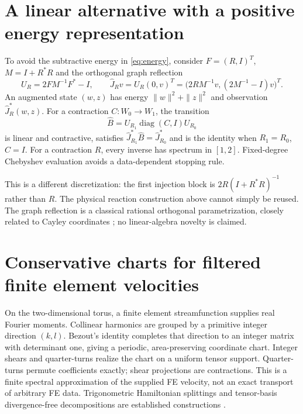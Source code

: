 \documentclass[10pt,a4paper]{article}
\begin{document}
\section{A linear alternative with a positive energy representation}
To avoid the subtractive energy in \eqref{eq:energy}, consider
$F=(R,I)^T$, $M=I+R^*R$ and the orthogonal graph reflection
\[
 U_R=2FM^{-1}F^*-I,\qquad
 \widehat J_Rv=U_R(0,v)^T
  =\bigl(2RM^{-1}v,(2M^{-1}-I)v\bigr)^T.
\]
An augmented state $(w,z)$ has energy $\|w\|^2+\|z\|^2$ and
observation $\widehat J_R^*(w,z)$. For a contraction
$C:W_0\to W_1$, the transition
\[
 \widehat B=U_{R_1}\operatorname{diag}(C,I)U_{R_0}
\]
is linear and contractive, satisfies
$\widehat J_{R_1}^*\widehat B=\widehat J_{R_0}^*$ and is the identity
when $R_1=R_0$, $C=I$. For a contraction $R$, every inverse has
spectrum in $[1,2]$. Fixed-degree Chebyshev evaluation avoids a
data-dependent stopping rule.

This is a different discretization: the first injection block is
$2R(I+R^*R)^{-1}$ rather than $R$. The physical reaction construction
above cannot simply be reused. The graph reflection is a classical
rational orthogonal parametrization, closely related to Cayley
coordinates \cite{cayley}; no linear-algebra novelty is claimed.


\section{Conservative charts for filtered finite element velocities}
On the two-dimensional torus, a finite element streamfunction supplies
real Fourier moments. Collinear harmonics are grouped by a primitive
integer direction $(k,l)$. Bezout's identity completes that direction
to an integer matrix with determinant one, giving a periodic,
area-preserving coordinate chart. Integer shears and quarter-turns
realize the chart on a uniform tensor support. Quarter-turns permute
coefficients exactly; shear projections are contractions. This is a
finite spectral approximation of the supplied FE velocity, not an
exact transport of arbitrary FE data. Trigonometric Hamiltonian
splittings and tensor-basis divergence-free decompositions are
established constructions \cite{quispel,zanna}.
\end{document}
